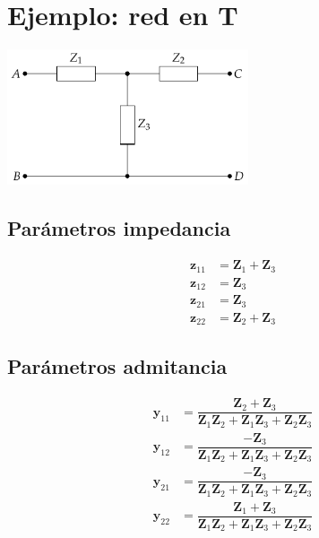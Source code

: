 \documentclass[10pt]{article}
\begin{document}
\clearpage

\section{Ejemplo: red en T}

\begin{center}
  \includegraphics[height=4cm]{../figs/cuadripolo_T}
\end{center}

\begin{minipage}[t]{0.5\textwidth}
  \subsection*{Parámetros impedancia}

  \begin{align*}
    \mathbf{z}_{11} &= \mathbf{Z}_1 + \mathbf{Z}_3\\
    \mathbf{z}_{12} &= \mathbf{Z}_3\\
    \mathbf{z}_{21} &= \mathbf{Z}_3\\
    \mathbf{z}_{22} &= \mathbf{Z}_2 + \mathbf{Z}_3
  \end{align*}
\end{minipage}
\begin{minipage}[t]{0.5\textwidth}
  \subsection*{Parámetros admitancia}

    \begin{align*}
      \mathbf{y}_{11} &= \dfrac{\mathbf{Z}_2 + \mathbf{Z}_3}{\mathbf{Z}_1\mathbf{Z}_2 + \mathbf{Z}_1\mathbf{Z}_3 + \mathbf{Z}_2\mathbf{Z}_3}\\
      \mathbf{y}_{12} &= \dfrac{-\mathbf{Z}_3}{\mathbf{Z}_1\mathbf{Z}_2 + \mathbf{Z}_1\mathbf{Z}_3 + \mathbf{Z}_2\mathbf{Z}_3}\\
      \mathbf{y}_{21} &= \dfrac{- \mathbf{Z}_3}{\mathbf{Z}_1\mathbf{Z}_2 + \mathbf{Z}_1\mathbf{Z}_3 + \mathbf{Z}_2\mathbf{Z}_3}\\
      \mathbf{y}_{22} &= \dfrac{\mathbf{Z}_1 + \mathbf{Z}_3}{\mathbf{Z}_1\mathbf{Z}_2 + \mathbf{Z}_1\mathbf{Z}_3 + \mathbf{Z}_2\mathbf{Z}_3}
    \end{align*}
\end{minipage}
\end{document}
